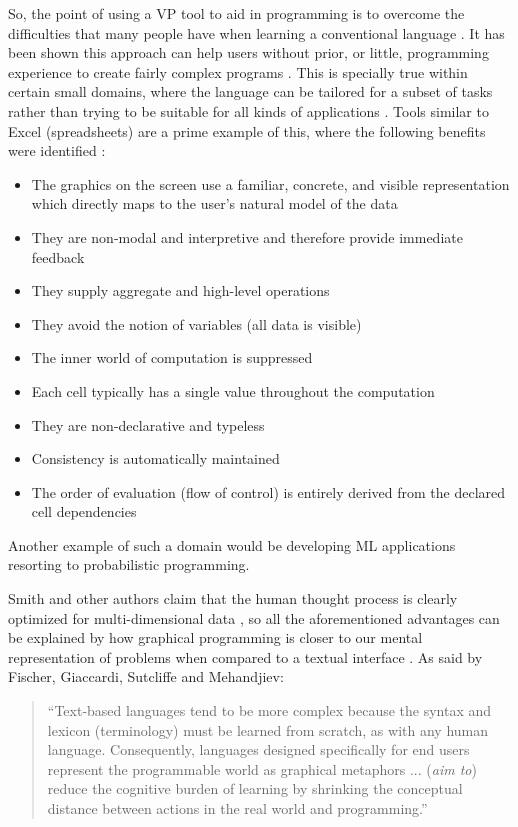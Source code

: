 \begin{itemsize}
So, the point of using a VP tool to aid in programming is to overcome the
difficulties that many people have when learning a conventional language
\cite{Lewis1987}. It has been shown this approach can help users without prior, or little,
programming experience to create fairly complex programs \cite{Halbert1984}.
This is specially true within certain small domains, where the language can be
tailored for a subset of tasks rather than trying to be suitable for all kinds
of applications \cite{Kelleher2005}. Tools similar to Excel (spreadsheets) are a prime example of this, where the following
benefits were identified \cite{ambler1987forms}\cite{Lewis1987}:

\begin{itemize}
  \item The graphics on the screen use a familiar, concrete, and visible representation which
directly maps to the user’s natural model of the data
  \item They are non-modal and interpretive and therefore provide immediate feedback
  \item They supply aggregate and high-level operations
  \item They avoid the notion of variables (all data is visible)
  \item The inner world of computation is suppressed
  \item Each cell typically has a single value throughout the computation
  \item They are non-declarative and typeless
  \item Consistency is automatically maintained
  \item The order of evaluation (flow of control) is entirely derived from the declared cell dependencies
\end{itemize}

Another example of such a domain would be
developing ML applications resorting to probabilistic programming.

Smith and other authors claim that the human thought process is clearly optimized
for multi-dimensional data \cite{smith1977pygmalion}\cite{Clarisse1986},
so all the aforementioned advantages can be explained by how graphical programming is closer
to our mental representation of problems when compared to a textual interface
\cite{Cardellini2002}. As said by Fischer, Giaccardi, Sutcliffe and Mehandjiev:

\begin{quote}
  ``Text-based languages tend to be more complex because the syntax and lexicon
  (terminology) must be learned from scratch, as with any human language.
  Consequently, languages designed specifically for end users represent the
  programmable world as graphical metaphors ... (\textit{aim to}) reduce the cognitive
  burden of learning by shrinking the conceptual distance between actions in
  the real world and programming.'' \cite{G2004}
\end{quote}


\end{itemsize}
